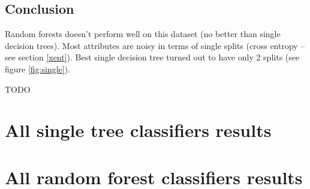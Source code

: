 \documentclass[a4paper]{article}
\begin{document}
\begin{multicols}{2}
% 
% 
\section{Conclusion}

Random forests doesn't perform well on this dataset (no better than single decision trees).
Most attributes are noisy in terms of single splits (cross entropy -- see section \ref{xent}).
Best single decision tree turned out to have only 2 splits (see figure \ref{fig:single}).

TODO


\end{multicols}

\newpage
\appendix
\section{All single tree classifiers results}
% 


\newpage
\section{All random forest classifiers results}
% 

\end{document}
